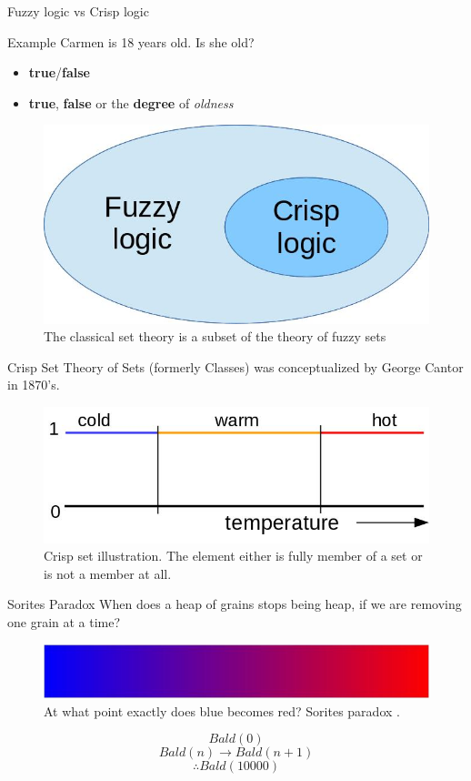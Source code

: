 \documentclass[hyperref={unicode}]{beamer}
\begin{document}
\begin{frame}{Fuzzy logic vs Crisp logic}
	\begin{exampleblock}{Example}
	Carmen is 18 years old. Is she old?
	\end{exampleblock}
	
	\begin{itemize}
		\setlength{\itemindent}{2cm}
		\item[Crisp\footnote{In this context referred also as a \emph{Boolean} or \emph{bivalent} logic}] \textbf{true}/\textbf{false}
		\item[Fuzzy]  \textbf{true}, \textbf{false} or the \textbf{degree} of \textit{oldness}
	\end{itemize}			
	
	\begin{figure}
	\includegraphics[width=.5\textwidth]{fuzzy-crisp.jpg}
	\caption{The classical set theory is a subset of the theory of fuzzy sets}
	\end{figure}
\end{frame}

\begin{frame}{Crisp Set}
	Theory of Sets (formerly Classes) was conceptualized by George Cantor in 1870's.
	\begin{figure}
	\includegraphics[width=.75\textwidth]{crisp-set.jpg}
	\caption{Crisp set illustration. The element either is fully member of a set or is not a member at all.}
	\end{figure}
\end{frame}

\begin{frame}{Sorites Paradox}
	When does a heap of grains stops being heap, if we are removing one grain at a time?
	
	\begin{figure}
	\includegraphics[width=.75\textwidth]{sorites-gradient.jpg}
	\caption{At what point exactly does blue becomes red? Sorites paradox \cite{podosky1985vagueness}.}
	\end{figure}
	
	$$Bald(0)$$
	$$Bald(n)\rightarrow Bald(n+1)$$
	$$\therefore Bald(10000)$$
\end{frame}
\end{document}
